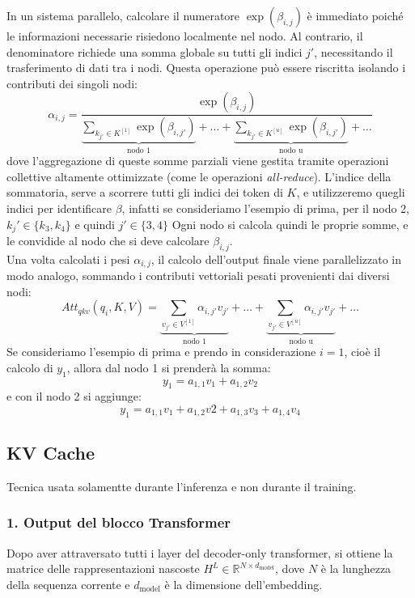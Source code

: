 In un sistema parallelo, calcolare il numeratore $\exp(\beta_{i,j})$ è immediato poiché le informazioni necessarie risiedono localmente nel nodo. Al contrario, il denominatore richiede una somma globale su tutti gli indici $j'$, necessitando il trasferimento di dati tra i nodi. Questa operazione può essere riscritta isolando i contributi dei singoli nodi:
\begin{equation}
\alpha_{i,j} = \frac{\exp(\beta_{i,j})}{\underbrace{\sum_{k_{j'} \in K^{[1]}} \exp(\beta_{i,j'})}_{\text{nodo 1}} + \dots + \underbrace{\sum_{k_{j'} \in K^{[u]}} \exp(\beta_{i,j'})}_{\text{nodo u}} + \dots}
\end{equation}
dove l'aggregazione di queste somme parziali viene gestita tramite operazioni collettive altamente ottimizzate (come le operazioni \textit{all-reduce}).
L'indice della sommatoria, serve a scorrere tutti gli indici dei token di $K$, e utilizzeremo quegli indici per identificare $\beta$, infatti se consideriamo l'esempio di prima, per il nodo 2, $k_j' \in \{k_3,k_4\}$ e quindi $j' \in \{3,4\}$
Ogni nodo si calcola quindi le proprie somme, e le convidide al nodo che si deve calcolare $\beta_{i,j}$.
\\
Una volta calcolati i pesi $\alpha_{i,j}$, il calcolo dell'output finale viene parallelizzato in modo analogo, sommando i contributi vettoriali pesati provenienti dai diversi nodi:
\begin{equation}
Att_{qkv}(q_i, K, V) = \underbrace{\sum_{v_{j'} \in V^{[1]}} \alpha_{i,j'} v_{j'}}_{\text{nodo 1}} + \dots + \underbrace{\sum_{v_{j'} \in V^{[u]}} \alpha_{i,j'} v_{j'}}_{\text{nodo u}} + \dots
\end{equation}
Se consideriamo l'esempio di prima e prendo in considerazione $i = 1$, cioè il calcolo di $y_1$, allora dal nodo 1 si prenderà la somma:
\begin{equation}
    y_1 = a_{1,1} v_1 + a_{1,2} v_2
\end{equation}
e con il nodo 2 si aggiunge:
\begin{equation}
    y_1 = a_{1,1} v_1 + a_{1,2} v2 + a_{1,3} v_3 + a_{1,4} v_4 
\end{equation}

\subsection{KV Cache}
Tecnica usata solamentte durante l'inferenza e non durante il training.
\subsubsection*{1. Output del blocco Transformer}
Dopo aver attraversato tutti i layer del decoder-only transformer, si ottiene la matrice delle rappresentazioni nascoste $H^L \in \mathbb{R}^{N \times d_{\text{model}}}$, dove $N$ è la lunghezza della sequenza corrente e $d_{\text{model}}$ è la dimensione dell'embedding. 

